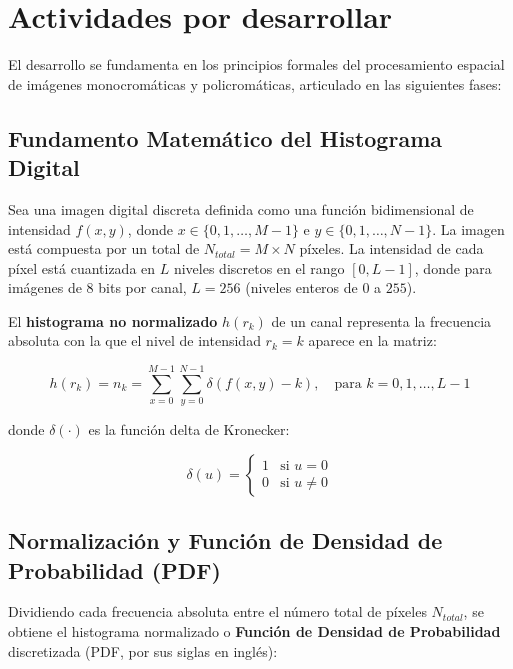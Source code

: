 \documentclass[12pt,a4paper]{article}
\begin{document}
\section{Actividades por desarrollar}

El desarrollo se fundamenta en los principios formales del procesamiento espacial de imágenes monocromáticas y policromáticas, articulado en las siguientes fases:

\subsection{Fundamento Matemático del Histograma Digital}

Sea una imagen digital discreta definida como una función bidimensional de intensidad $f(x, y)$, donde $x \in \{0, 1, \dots, M-1\}$ e $y \in \{0, 1, \dots, N-1\}$. La imagen está compuesta por un total de $N_{total} = M \times N$ píxeles. La intensidad de cada píxel está cuantizada en $L$ niveles discretos en el rango $[0, L-1]$, donde para imágenes de 8 bits por canal, $L = 256$ (niveles enteros de $0$ a $255$).

El \textbf{histograma no normalizado} $h(r_k)$ de un canal representa la frecuencia absoluta con la que el nivel de intensidad $r_k = k$ aparece en la matriz:

\begin{equation}
h(r_k) = n_k = \sum_{x=0}^{M-1} \sum_{y=0}^{N-1} \delta(f(x, y) - k), \quad \text{para } k = 0, 1, \dots, L-1
\end{equation}

donde $\delta(\cdot)$ es la función delta de Kronecker:

\begin{equation}
\delta(u) = \begin{cases} 
1 & \text{si } u = 0 \\
0 & \text{si } u \neq 0 
\end{cases}
\end{equation}

\subsection{Normalización y Función de Densidad de Probabilidad (PDF)}

Dividiendo cada frecuencia absoluta entre el número total de píxeles $N_{total}$, se obtiene el histograma normalizado o \textbf{Función de Densidad de Probabilidad} discretizada (PDF, por sus siglas en inglés):
\end{document}

